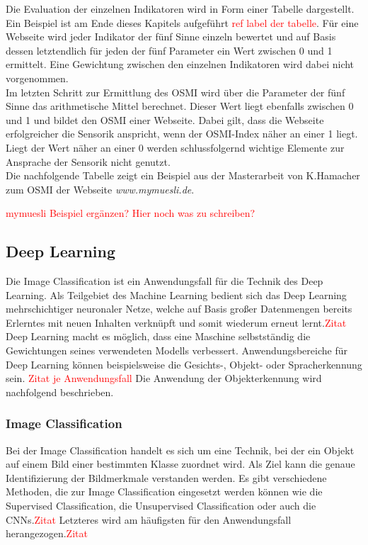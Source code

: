 Die Evaluation der einzelnen Indikatoren wird in Form einer Tabelle dargestellt. Ein Beispiel ist am Ende dieses Kapitels aufgeführt \textcolor{red}{ref label der tabelle}.
Für eine Webseite wird jeder Indikator der fünf Sinne einzeln bewertet und auf Basis dessen letztendlich für jeden der fünf Parameter ein Wert zwischen 0 und 1 ermittelt.
Eine Gewichtung zwischen den einzelnen Indikatoren wird dabei nicht vorgenommen. \\
Im letzten Schritt zur Ermittlung des \ac{OSMI} wird über die Parameter der fünf Sinne das arithmetische Mittel berechnet.
Dieser Wert liegt ebenfalls zwischen 0 und 1 und bildet den \ac{OSMI} einer Webseite. Dabei gilt, dass die Webseite erfolgreicher die Sensorik anspricht, wenn der OSMI-Index näher an einer 1 liegt.
Liegt der Wert näher an einer 0 werden schlussfolgernd wichtige Elemente zur Ansprache der Sensorik nicht genutzt. \\
Die nachfolgende Tabelle zeigt ein Beispiel aus der Masterarbeit von K.Hamacher zum \ac{OSMI} der Webseite \textit{www.mymuesli.de}.

\textcolor{red}{mymuesli Beispiel ergänzen? Hier noch was zu schreiben?}


\subsection{Deep Learning}

Die Image Classification ist ein Anwendungsfall für die Technik des Deep Learning.
Als Teilgebiet des Machine Learning bedient sich das Deep Learning mehrschichtiger neuronaler Netze, welche auf Basis großer Datenmengen bereits Erlerntes mit neuen Inhalten verknüpft und somit wiederum erneut lernt.\textcolor{red}{Zitat}
Deep Learning macht es möglich, dass eine Maschine selbstständig die Gewichtungen seines verwendeten Modells verbessert.
Anwendungsbereiche für Deep Learning können beispielsweise die Gesichts-, Objekt- oder Spracherkennung sein. \textcolor{red}{Zitat je Anwendungsfall} Die Anwendung der Objekterkennung wird nachfolgend beschrieben.

\subsubsection{Image Classification}
Bei der Image Classification handelt es sich um eine Technik, bei der ein Objekt auf einem Bild einer bestimmten Klasse zuordnet wird. Als Ziel kann die genaue Identifizierung der Bildmerkmale verstanden werden.
Es gibt verschiedene Methoden, die zur Image Classification eingesetzt werden können wie die Supervised Classification, die Unsupervised Classification oder auch die \acp{CNN}.\textcolor{red}{Zitat}
Letzteres wird am häufigsten für den Anwendungsfall herangezogen.\textcolor{red}{Zitat}

